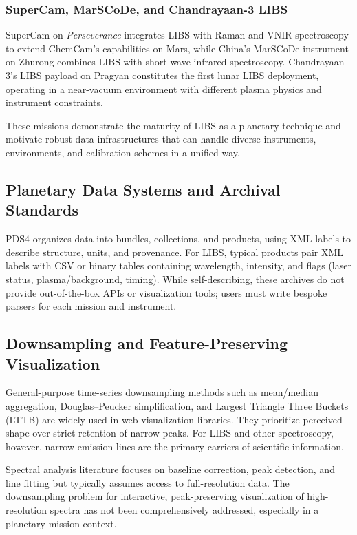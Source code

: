 \documentclass[12pt,a4paper]{article}
\begin{document}
\subsubsection{SuperCam, MarSCoDe, and Chandrayaan-3 LIBS}

SuperCam on \emph{Perseverance} integrates LIBS with Raman and VNIR spectroscopy to extend ChemCam's capabilities on Mars, while China's MarSCoDe instrument on Zhurong combines LIBS with short-wave infrared spectroscopy. Chandrayaan-3's LIBS payload on Pragyan constitutes the first lunar LIBS deployment, operating in a near-vacuum environment with different plasma physics and instrument constraints.

These missions demonstrate the maturity of LIBS as a planetary technique and motivate robust data infrastructures that can handle diverse instruments, environments, and calibration schemes in a unified way.

\subsection{Planetary Data Systems and Archival Standards}

PDS4 organizes data into bundles, collections, and products, using XML labels to describe structure, units, and provenance. For LIBS, typical products pair XML labels with CSV or binary tables containing wavelength, intensity, and flags (laser status, plasma/background, timing). While self-describing, these archives do not provide out-of-the-box APIs or visualization tools; users must write bespoke parsers for each mission and instrument.

\subsection{Downsampling and Feature-Preserving Visualization}

General-purpose time-series downsampling methods such as mean/median aggregation, Douglas--Peucker simplification, and Largest Triangle Three Buckets (LTTB) are widely used in web visualization libraries. They prioritize perceived shape over strict retention of narrow peaks. For LIBS and other spectroscopy, however, narrow emission lines are the primary carriers of scientific information.

Spectral analysis literature focuses on baseline correction, peak detection, and line fitting but typically assumes access to full-resolution data. The downsampling problem for interactive, peak-preserving visualization of high-resolution spectra has not been comprehensively addressed, especially in a planetary mission context.
\end{document}
